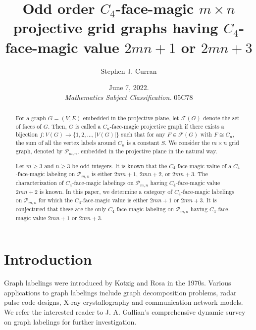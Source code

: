 \documentclass[12pt]{amsart}
\theoremstyle{definition}
\theoremstyle{plain}
\begin{document}
\title[Odd order $C_4$-face-magic projective grid graphs]{Odd order $C_4$-face-magic $m \times n$ projective grid graphs having $C_4$-face-magic value $2mn+1$ or $2mn+3$}
\author{Stephen J. Curran}
\address{Department of Mathematics\\
         University of Pittsburgh at Johnstown\\
         Johnstown, PA 15904\\
         USA}

\date{June 7, 2022.  \\
 \textit{Mathematics Subject Classification.} 05C78}

\begin{abstract}
For a graph $G = (V, E)$ embedded in the projective plane, let $\mathcal{F}(G)$ denote the set of faces of $G$.
Then, $G$ is called a $C_n$-face-magic projective graph if there exists a bijection $f: V(G) \to \{1, 2, \dots, |V(G)|\}$
such that for any $F \in \mathcal{F}(G)$ with $F \cong C_n$, the sum of all the vertex labels around $C_n$ is a constant $S$.
We consider the $m \times n$ grid graph, denoted by $\mathcal{P}_{m,n}$, embedded in the projective plane in the natural way.

Let $m \geqslant 3$ and $n \geqslant 3$ be odd integers.
It is known that the $C_4$-face-magic value of a $C_4$-face-magic labeling on $\mathcal{P}_{m,n}$ is either $2mn+1$, $2mn+2$, or $2mn+3$.
The characterization of $C_4$-face-magic labelings on $\mathcal{P}_{m,n}$ having $C_4$-face-magic value $2mn+2$ is known.
In this paper, we determine a category of $C_4$-face-magic labelings on $\mathcal{P}_{m,n}$ for which the
$C_4$-face-magic value is either $2mn+1$ or $2mn+3$.
It is conjectured that these are the only $C_4$-face-magic labeling on $\mathcal{P}_{m,n}$ having $C_4$-face-magic value $2mn+1$ or $2mn+3$.
\end{abstract}

\maketitle


\section{Introduction} \label{S:introduction}

Graph labelings were introduced by Kotzig and Rosa \cite{Kotzig} in the 1970s.
Various applications to graph labelings include graph decomposition problems, radar pulse code designs, X-ray
crystallography and communication network models.
We refer the interested reader to J. A. Gallian's comprehensive dynamic survey on graph labelings \cite{Gallian}
for further investigation.
\end{document}
